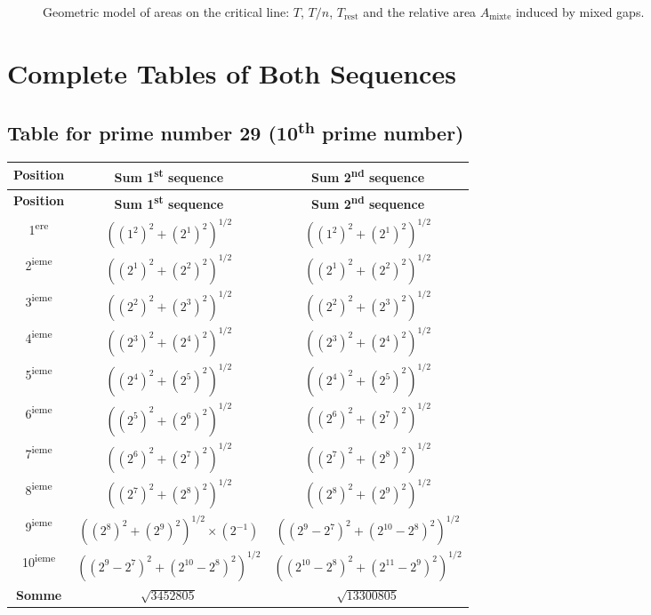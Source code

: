 \documentclass[a4paper,11pt]{article}
\begin{document}
\begin{figure}[h]
  \centering
  \caption{Geometric model of areas on the critical line: $T$, $T/n$,
  $T_{\text{rest}}$ and the relative area $A_{\text{mixte}}$ induced by
  mixed gaps.}
\end{figure}

\newpage
\section{Complete Tables of Both Sequences}

\subsection{Table for prime number 29 (10\textsuperscript{th} prime number)}

\begin{center}
\begin{longtable}{|c|c|c|}
\hline
\textbf{Position} & \textbf{Sum 1\textsuperscript{st} sequence} & \textbf{Sum 2\textsuperscript{nd} sequence} \\
\hline
\endfirsthead
\hline
\textbf{Position} & \textbf{Sum 1\textsuperscript{st} sequence} & \textbf{Sum 2\textsuperscript{nd} sequence} \\
\hline
\endhead
1\textsuperscript{ere} & $((1^2)^2 + (2^1)^2)^{1/2}$ & $((1^2)^2 + (2^1)^2)^{1/2}$ \\
\hline
2\textsuperscript{ieme} & $((2^1)^2 + (2^2)^2)^{1/2}$ & $((2^1)^2 + (2^2)^2)^{1/2}$ \\
\hline
3\textsuperscript{ieme} & $((2^2)^2 + (2^3)^2)^{1/2}$ & $((2^2)^2 + (2^3)^2)^{1/2}$ \\
\hline
4\textsuperscript{ieme} & $((2^3)^2 + (2^4)^2)^{1/2}$ & $((2^3)^2 + (2^4)^2)^{1/2}$ \\
\hline
5\textsuperscript{ieme} & $((2^4)^2 + (2^5)^2)^{1/2}$ & $((2^4)^2 + (2^5)^2)^{1/2}$ \\
\hline
6\textsuperscript{ieme} & $((2^5)^2 + (2^6)^2)^{1/2}$ & $((2^6)^2 + (2^7)^2)^{1/2}$ \\
\hline
7\textsuperscript{ieme} & $((2^6)^2 + (2^7)^2)^{1/2}$ & $((2^7)^2 + (2^8)^2)^{1/2}$ \\
\hline
8\textsuperscript{ieme} & $((2^7)^2 + (2^8)^2)^{1/2}$ & $((2^8)^2 + (2^9)^2)^{1/2}$ \\
\hline
9\textsuperscript{ieme} & $((2^8)^2 + (2^9)^2)^{1/2} \times (2^{-1})$ & $((2^9-2^7)^2 + (2^{10}-2^8)^2)^{1/2}$ \\
\hline
10\textsuperscript{ieme} & $((2^9-2^7)^2 + (2^{10}-2^8)^2)^{1/2}$ & $((2^{10}-2^8)^2 + (2^{11}-2^9)^2)^{1/2}$ \\
\hline
\textbf{Somme} & $\sqrt{3452805}$ & $\sqrt{13300805}$ \\
\hline
\end{longtable}
\end{center}
\end{document}
